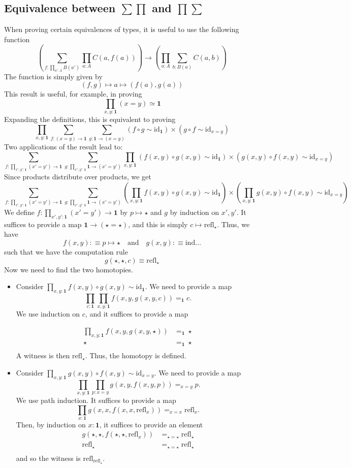 \documentclass[14pt]{extarticle}
\newcommand{\0}{{\mathbf 0}}
\newcommand{\1}{{\mathbf 1}}
\newcommand{\2}{{\mathbf 2}}
\newcommand{\mt}{\mapsto}
\newcommand{\ind}{\mathrm{ind}}
\newcommand{\refl}{\mathrm{refl}}
\newcommand{\id}{\mathrm{id}}
\begin{document}
\subsection*{Equivalence between $\sum \prod$ and $\prod \sum$}
When proving certain equivalences of types, it is useful to use the following function
\[\left(\sum_{f: \prod_{a':A} B(a')}\prod_{a:A} C(a,f(a))\right) \to \left(\prod_{a:A} \sum_{b:B(a)}C(a,b)\right)\]
The function is simply given by \[(f,g) \mt a \mt (f(a), g(a))\]
This result is useful, for example, in proving
\[\prod_{x,y : \1} (x=y) \simeq \1\]
Expanding the definitions, this is equivalent to proving
\[\prod_{x,y : \1} \sum_{f : (x=y) \to \1} \sum_{g : \1 \to (x=y)} \left( f \circ g \sim \id_{\1}\right) \times \left( g \circ f \sim \id_{x=y}\right)\]
Two applications of the result lead to:
\[\sum_{f : \prod_{x',y' : \1}(x'=y') \to \1} \sum_{g : \prod_{x',y' : \1}\1 \to (x'=y')} \prod_{x,y : \1} \left( f(x,y) \circ g(x,y) \sim \id_{\1}\right) \times \left( g(x,y) \circ f(x,y) \sim \id_{x=y}\right)\]
Since products distribute over products, we get
\[\sum_{f : \prod_{x',y' : \1}(x'=y') \to \1} \sum_{g : \prod_{x',y' : \1}\1 \to (x'=y')}  \left(\prod_{x,y : \1} f(x,y) \circ g(x,y) \sim \id_{\1}\right) \times \left(\prod_{x,y : \1} g(x,y) \circ f(x,y) \sim \id_{x=y}\right)\]
We define $f : \prod_{x',y' : \1}(x'=y') \to \1$ by $p \mt \star$ and $g$ by induction on $x',y'$. It suffices to provide a map $\1 \to (\star = \star)$, and this is simply $c \mt \refl_\star$. Thus, we have
\[f(x,y) :\equiv p \mt \star \quad \text{and} \quad g(x,y) :\equiv \ind \ldots\] such that we have the computation rule
\[g(\star,\star,c) \equiv \refl_\star\]
Now we need to find the two homotopies.

\begin{itemize}
\item Consider $\prod_{x,y : \1} f(x,y) \circ g(x,y) \sim \id_{\1}$. We need to provide a map \[\prod_{c : \1}\prod_{x,y : \1} f(x,y, g(x,y,c)) =_\1 c.\] We use induction on $c$, and it suffices to provide a map

\begin{align*}
\prod_{x,y:\1}f(x,y,g(x,y,\star)) &=_\1 \star \\
\star &=_\1 \star \\
\end{align*} 
A witness is then $\refl_\star$. Thus, the homotopy is defined.

\item Consider $\prod_{x,y : \1} g(x,y) \circ f(x,y) \sim \id_{x=y}$. We need to provide a map \[\prod_{x,y : \1}\prod_{p : x=y} g(x,y,f(x,y,p)) =_{x=y} p.\]
We use path induction. It suffices to provide a map \[\prod_{x : \1}g(x,x,f(x,x,\refl_x)) =_{x=x}\refl_x.\] Then, by induction on $x:\1$, it suffices to provide an element
\begin{align*}
g(\star,\star,f(\star,\star,\refl_x)) &=_{\star=\star}\refl_\star \\
\refl_\star &=_{\star=\star}\refl_\star \\
\end{align*}
and so the witness is $\refl_{\refl_\star}$.
\end{itemize}
\end{document}
